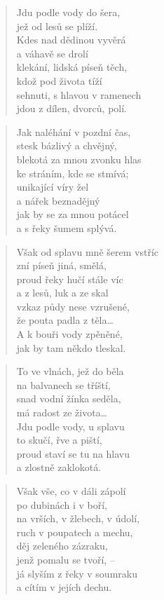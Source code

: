 \documentclass{book}
\begin{document}
\newpage
{}
\begin{verse}
Jdu podle vody do šera,\\
jež od lesů se plíží.\\
Kdes nad dědinou vyvěrá\\
a váhavě se drolí\\
klekání, lidská píseň těch,\\
kdož pod života tíží\\
sehnuti, s hlavou v ramenech\\
jdou z dílen, dvorců, polí.
\end{verse}
\begin{verse}
Jak naléhání v pozdní čas,\\
stesk bázlivý a chvějný,\\
blekotá za mnou zvonku hlas\\
ke stráním, kde se stmívá;\\
unikající víry žel\\
a nářek beznadějný\\
jak by se za mnou potácel\\
a s řeky šumem splývá.
\end{verse}
\begin{verse}
Však od splavu mně šerem vstříc\\
zní píseň jiná, smělá,\\
proud řeky hučí stále víc\\
a z lesů, luk a ze skal\\
vzkaz půdy nese vzrušené,\\
že pouta padla z těla\ldots\\
A k bouři vody zpěněné,\\
jak by tam někdo tleskal.
\end{verse}
\begin{verse}
To ve vlnách, jež do běla\\
na balvanech se tříští,\\
snad vodní žínka seděla,\\
má radost ze života\ldots\\
Jdu podle vody, u splavu\\
to skučí, řve a piští,\\
proud staví se tu na hlavu\\
a zlostně zaklokotá.
\end{verse}
\begin{verse}
Však vše, co v dáli zápolí\\
po dubinách i v boří,\\
na vrších, v žlebech, v údolí,\\
ruch v poupatech a mechu,\\
děj zeleného zázraku,\\
jenž pomalu se tvoří, --\\
já slyším z řeky v soumraku\\
a cítím v jejích dechu.
\end{verse}
\end{document}

